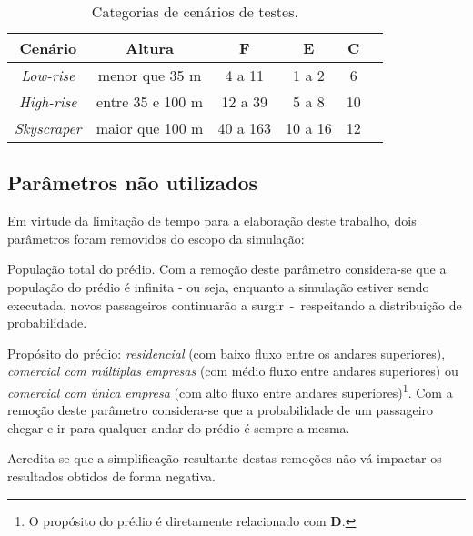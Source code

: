\begin{table}[htb!]
\centering
\caption{Categorias de cenários de testes.}
\label{tab:cenarios}
\begin{tabular}{|c|c|c|c|c|c|}
\hline
{\bf Cenário} & {\bf Altura} & {\bf F}  & {\bf E} & {\bf C}
\\ \hline
{\it Low-rise}   & menor que 35 m    & 4 a 11         & 1 a 2   & 6  \\ \hline
{\it High-rise}  & entre 35 e 100 m  & 12 a 39        & 5 a 8   & 10 \\ \hline
{\it Skyscraper} & maior que 100 m   & 40 a 163       & 10 a 16 & 12 \\ \hline
\end{tabular}
\end{table}

\subsection{Parâmetros não utilizados}

Em virtude da limitação de tempo para a elaboração deste trabalho, dois
parâmetros foram removidos do escopo da simulação:

\begin{description}[leftmargin=!,labelwidth=\widthof{\bfseries Pu}]\setlength\itemsep{0mm}
  \item[P]
  População total do prédio. Com a remoção deste parâmetro considera-se que a
  população do prédio é infinita - ou seja, enquanto a simulação estiver sendo
  executada, novos passageiros continuarão a surgir~-~respeitando a distribuição
  de probabilidade.

  \item[Pu]
  Propósito do prédio: \textit{residencial} (com baixo fluxo entre os andares
  superiores), \textit{comercial com múltiplas empresas} (com médio fluxo entre
  andares superiores) ou \textit{comercial com única empresa} (com alto fluxo
  entre andares superiores)\footnote{O propósito do prédio é diretamente
  relacionado com \textbf{D}.}. Com a remoção deste parâmetro considera-se que
  a probabilidade de um passageiro chegar e ir para qualquer andar do prédio é
  sempre a mesma.
\end{description}

Acredita-se que a simplificação resultante destas remoções não vá impactar os
resultados obtidos de forma negativa.

